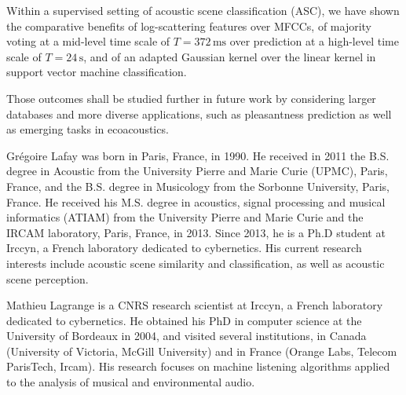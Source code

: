 \documentclass[journal]{IEEEtran}
\newcommand{\ja}[1]{\textcolor{magenta}{Joakim : #1}}
\begin{document}
Within a supervised setting of acoustic scene classification (ASC), we have shown the comparative benefits of log-scattering features over MFCCs, of majority voting at a mid-level time scale of $T=372\,\mathrm{ms}$ over prediction at a high-level time scale of $T=24\,\mathrm{s}$, and of an adapted Gaussian kernel over the linear kernel in support vector machine classification.

Those outcomes shall be studied further in future work by considering larger databases and more diverse applications, such as pleasantness prediction \cite{lafaySoundscapePilot} as well as emerging tasks in ecoacoustics.





\begin{IEEEbiography}{Gr\'egoire Lafay} was born in Paris, France, in 1990. He received in 2011 the B.S. degree in Acoustic from the University Pierre and Marie Curie (UPMC), Paris, France, and the B.S. degree in Musicology from the Sorbonne University, Paris, France. He received his M.S. degree in acoustics, signal processing and musical informatics (ATIAM) from the University Pierre and Marie Curie and the IRCAM laboratory, Paris, France, in 2013. Since 2013, he is a Ph.D student at Irccyn, a French laboratory dedicated to cybernetics. His current research interests include acoustic scene similarity and classification, as well as acoustic scene perception. 
\end{IEEEbiography}

\begin{IEEEbiography}{Mathieu Lagrange} is a CNRS research scientist at Irccyn, a French laboratory dedicated to cybernetics. He obtained his PhD in computer science at the University of Bordeaux in 2004, and visited several institutions, in Canada (University of Victoria, McGill University) and in France (Orange Labs, Telecom ParisTech, Ircam). His research focuses on machine listening algorithms applied to the analysis of musical and environmental audio.
\end{IEEEbiography}
\end{document}
